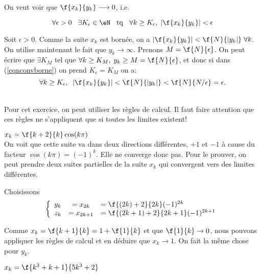 \noindent On veut voir que $\f{x_k}{y_k}\longrightarrow 0$, i.e.

\begin{equation}
	\label{eqnconvborne}  \forall  \epsilon > 0 \hspace{0.3cm} \exists K_\epsilon \in \eN \hspace{0.3cm} {\rm tq} \hspace{0.3cm} \forall k \geq K_\epsilon, \; |\f{x_k}{y_k}| < \epsilon \end{equation}

\noindent Soit $\epsilon >0$. Comme la suite $x_k$ est bornée, on a $|\f{x_k}{y_k}|<\f{N}{|y_k|}\; \forall k$. On utilise maintenant le fait que $y_k \longrightarrow \infty$. Prenons $M=\f{N}{\epsilon}$. On peut écrire que $\exists K_M$ tel que $\forall k \geq K_M, \; y_k \geq M=\f{N}{\epsilon}$, et donc si dans (\ref{eqnconvborne}) on prend $K_\epsilon= K_M$ on a:\[\forall k \geq K_\epsilon,\; \; |\f{x_k}{y_k}|<\f{N}{|y_k|}<\f{N}{N/\epsilon}=\epsilon.\]



\\

\noindent Pour cet exercice, on peut utiliser les règles de calcul. Il faut faire attention que ces règles ne s'appliquent que si toutes les limites existent!

\vspace{0.5cm}
 $x_k = \f{k+2}{k}\cos(k\pi)$\\

\noindent On voit que cette suite va dans deux directions différentes, $+1$ et $-1$ à cause du facteur $\cos(k\pi)=(-1)^k$. Elle ne converge donc pas. Pour le prouver, on peut prendre deux suites partielles de la suite $x_k$ qui convergent vers des limites différentes.

\noindent Choisissons \[\left\{ \begin{array}{rcl} y_k & = x_{2k}   & = \f{(2k)+2}{2k}(-1)^{2k}        \\
             z_k       & = x_{2k+1} & = \f{(2k+1)+2}{2k+1} (-1)^{2k+1}\end{array}\right.\]

\noindent Comme $x_k =\f{k+1}{k}= 1+\f{1}{k}$	et que $\f{1}{k} \rightarrow  0$, nous pouvons appliquer les règles de calcul et en déduire que $x_k \rightarrow  1$. On fait la même chose pour $y_k$.


\vspace{0.5cm}
 $x_k = \f{k^3+k+1}{5k^3+2}$\\

